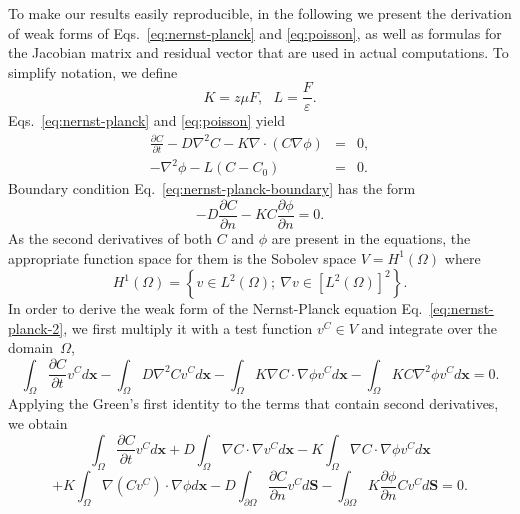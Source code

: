 To make our results easily reproducible, in the following we present the derivation 
of weak forms of Eqs.~\eqref{eq:nernst-planck} and 
\eqref{eq:poisson}, as well as formulas for the Jacobian matrix and residual 
vector that are used in actual computations.
To simplify notation, we define
\begin{equation}
  K = z \mu F,\ \ \
  L = \frac{F}{\varepsilon}.
  \label{eq:KL}
\end{equation}
Eqs.~\eqref{eq:nernst-planck} and \eqref{eq:poisson} yield
\begin{eqnarray}
  \frac{\partial C}{\partial t}-D\nabla^2 C-K\nabla\cdot \left(C\nabla\phi\right)&=&0,\label{eq:nernst-planck-2}\\
  -\nabla^2\phi-L\left(C-C_{0}\right)&=&0.\label{eq:poisson-2}
\end{eqnarray}
Boundary condition Eq.~\eqref{eq:nernst-planck-boundary} has the form
\begin{equation}
  -D\frac{\partial C}{\partial n}-KC\frac{\partial\phi}{\partial n}=0.
  \label{eq:nernst-planck-boundary-2}
\end{equation}
As the second derivatives of both $C$ and $\phi$ are present in the 
equations, the appropriate function space for them is the Sobolev space 
$V=H^1\left(\Omega\right)$ where 
$$H^1\left(\Omega\right)=\left\{v\in L^2\left(\Omega\right);\ \nabla v \in \left[L^2\left(\Omega\right)\right]^2\right\}.
$$
In order to derive the weak form of the Nernst-Planck equation Eq.~\eqref{eq:nernst-planck-2},
we first multiply it with a test function $v^C \in V$ and integrate over the domain~$\Omega$,
\begin{equation}
  \int_{\Omega}\frac{\partial C}{\partial t}v^C d\mathbf{x}
  -\int_{\Omega}D\nabla^2Cv^C d\mathbf{x}-\int_{\Omega}K\nabla C\cdot\nabla\phi v^C d\mathbf{x}
   - \int_{\Omega}KC\nabla^2\phi v^C d\mathbf{x}=0.
  \label{eq:nernst-planck-weak1}
\end{equation}
Applying the Green's first identity to the terms that contain second derivatives,
we obtain
$$
 \int_{\Omega}\frac{\partial C}{\partial t}v^C d\mathbf{x}+
  D\int_{\Omega}\nabla C\cdot\nabla v^C d\mathbf{x}-
  K\int_{\Omega}\nabla C \cdot \nabla \phi v^C d\mathbf{x}
$$
\begin{equation}
  + K\int_{\Omega}\nabla\left(Cv^C\right)\cdot \nabla \phi d\mathbf{x}
  -D\int_{\partial\Omega}\frac{\partial C}{\partial n}v^C d\mathbf{S}-
  \int_{\partial\Omega}K\frac{\partial\phi}{\partial n}Cv^C d\mathbf{S}=0.
  \label{eq:nernst-planck-weak2}
\end{equation}
